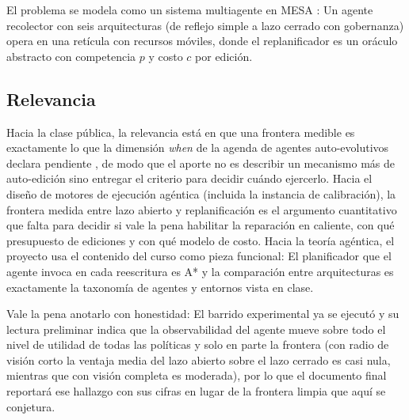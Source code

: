 \begin{quote}
  \proyPregunta
\end{quote}

El problema se modela como un sistema multiagente en MESA \parencite{kazil2020mesa}: Un
agente recolector con seis arquitecturas (de reflejo simple a lazo cerrado con
gobernanza) opera en una retícula con recursos móviles, donde el replanificador es
un oráculo abstracto con competencia $p$ y costo $c$ por edición.

\subsection*{Relevancia}

Hacia la clase pública, la relevancia está en que una frontera medible es exactamente lo que la dimensión \emph{when} de la agenda de agentes auto-evolutivos declara pendiente \parencite{gao2026selfevolving}, de modo que el aporte no es describir un mecanismo más de auto-edición sino entregar el criterio para decidir cuándo ejercerlo. Hacia el diseño de motores de ejecución agéntica (incluida la instancia de calibración), la frontera medida entre lazo abierto y replanificación es el argumento cuantitativo que falta para decidir si vale la pena habilitar la reparación en caliente, con qué presupuesto de ediciones y con qué modelo de costo. Hacia la teoría agéntica, el proyecto usa el contenido del curso como pieza funcional: El planificador que el agente invoca en cada reescritura es A* y la comparación entre arquitecturas es exactamente la taxonomía de agentes y entornos vista en clase.

Vale la pena anotarlo con honestidad: El barrido experimental ya se ejecutó y su lectura preliminar indica que la observabilidad del agente mueve sobre todo el nivel de utilidad de todas las políticas y solo en parte la frontera (con radio de visión corto la ventaja media del lazo abierto sobre el lazo cerrado es casi nula, mientras que con visión completa es moderada), por lo que el documento final reportará ese hallazgo con sus cifras en lugar de la frontera limpia que aquí se conjetura.
